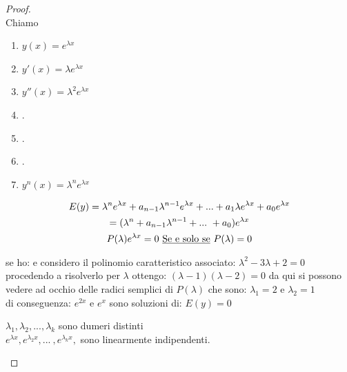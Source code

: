 \documentclass[a4paper, oneside]{article}
\begin{document}
\begin{proof}
    \hfil\\
    Chiamo
    \begin{enumerate}[ ]
        \item $y(x) = e^{\lambda x}$
        \item $y'(x) = \lambda e^{\lambda x}$
        \item $y''(x) = \lambda^2 e^{\lambda x}$
        \item .
        \item .
        \item .
        \item $y^n(x) = \lambda^n e^{\lambda x}$
    \end{enumerate}
    \begin{gather*}
        E(y) = \lambda^n e^{\lambda x} + a_{n-1} \lambda^{n-1} e^{\lambda x} + ... + a_1\lambda e^{\lambda x } + a_0 e^{\lambda x}\\
        = (\lambda^n + a_{n-1}\lambda^{n-1}+ ... \ + a_0)e^{\lambda x}\\
        P(\lambda) e^{\lambda x} = 0 \ \text{\underbar{Se e solo se} } P(\lambda) = 0\\
    \end{gather*}
\begin{example}
            se ho:  e considero il polinomio caratteristico associato: $\lambda^2 - 3\lambda + 2 = 0$\\
            procedendo a risolverlo per $\lambda$ ottengo: $(\lambda - 1)(\lambda - 2) = 0$
            da qui si possono vedere ad occhio delle radici semplici di $P(\lambda)$ che sono: $\lambda_1= 2$ e $\lambda_2 = 1$ \\
            di conseguenza: $e^{2x}$ e $e^x$ sono soluzioni di: $E(y) = 0$\\
\end{example}
    \begin{observation}
         $\lambda_1,\lambda_2, ... , \lambda_k $ sono dumeri distinti \\ 
         $e^{\lambda x},e^{\lambda_2 x}, ... \ , e^{\lambda_k x},$ sono linearmente indipendenti.\\
    \end{observation}
\end{proof}
\end{document}
